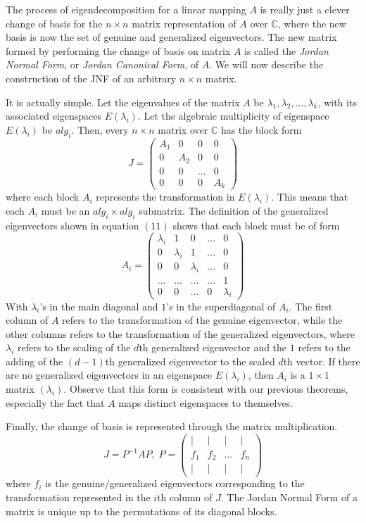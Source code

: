 \documentclass{article}
\begin{document}
    The process of eigendecomposition for a linear mapping $A$ is really just a clever change of basis for the $n \times n$ matrix representation of $A$ over $\mathbb{C}$, where the new basis is now the set of genuine and generalized eigenvectors. The new matrix formed by performing the change of basis on matrix $A$ is called the \textit{Jordan Normal Form}, or \textit{Jordan Canonical Form}, of $A$. We will now describe the construction of the JNF of an arbitrary $n \times n$ matrix. 

    It is actually simple. Let the eigenvalues of the matrix $A$ be $\lambda_1, \lambda_2, ..., \lambda_k$, with its associated eigenspaces $E(\lambda_i)$. Let the algebraic multiplicity of eigenspace $E(\lambda_i)$ be $alg_i$. Then, every $n \times n$ matrix over $\mathbb{C}$ has the block form 
    \[ J = \begin{pmatrix}
    A_1&0&0&0\\
    0&A_2&0&0\\
    0&0&...&0\\
    0&0&0&A_k
    \end{pmatrix}\]
    where each block $A_i$ represents the transformation in $E(\lambda_i)$. This means that each $A_i$ must be an $alg_i \times alg_i$ submatrix. The definition of the generalized eigenvectors shown in equation $(11)$ shows that each block must be of form 
    \[A_i = \begin{pmatrix}
    \lambda_i & 1 & 0 & ... & 0\\
    0 &\lambda_i & 1 &...&0 \\
    0&0&\lambda_i&...&0\\
    ...&...&...&...&1\\
    0&0&...&0&\lambda_i
    \end{pmatrix}\]
    With $\lambda_i$'s in the main diagonal and $1$'s in the superdiagonal of $A_i$. The first column of $A$ refers to the transformation of the genuine eigenvector, while the other columns refers to the transformation of the generalized eigenvectors, where $\lambda_i$ refers to the scaling of the $d$th generalized eigenvector and the $1$ refers to the adding of the $(d-1)$th generalized eigenvector to the scaled $d$th vector. If there are no generalized eigenvectors in an eigenspace $E(\lambda_i)$, then $A_i$ is a $1 \times 1$ matrix $( \lambda_i )$. Observe that this form is consistent with our previous theorems, especially the fact that $A$ maps distinct eigenspaces to themselves. 

    Finally, the change of basis is represented through the matrix multiplication. 
    \[J = P^{-1} A P, \; P = \begin{pmatrix}
    |&|&|&| \\ 
    f_1&f_2&...&f_n \\
    |&|&|&|
    \end{pmatrix} \]
    where $f_i$ is the genuine/generalized eigenvectors corresponding to the transformation represented in the $i$th column of $J$. The Jordan Normal Form of a matrix is unique up to the permutations of its diagonal blocks. 
\end{document}
